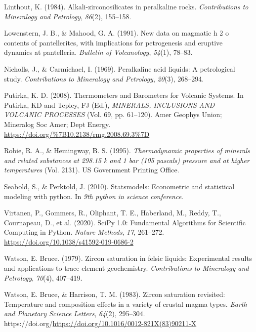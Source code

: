 \documentclass[
]{agujournal2019}
\newlength{\cslhangindent}
\newenvironment{CSLReferences}[2] %
 {\begin{list}{}{%
  \setlength{\itemindent}{0pt}
  \setlength{\leftmargin}{0pt}
  \setlength{\parsep}{0pt}
  \ifodd #1
   \setlength{\leftmargin}{\cslhangindent}
   \setlength{\itemindent}{-1\cslhangindent}
  \fi
  \setlength{\itemsep}{#2\baselineskip}}}
 {\end{list}}
\begin{document}
\begin{CSLReferences}{1}{0}
Linthout, K. (1984). Alkali-zirconosilicates in peralkaline rocks.
\emph{Contributions to Mineralogy and Petrology}, \emph{86}(2),
155--158.

Lowenstern, J. B., \& Mahood, G. A. (1991). New data on magmatic h 2 o
contents of pantellerites, with implications for petrogenesis and
eruptive dynamics at pantelleria. \emph{Bulletin of Volcanology},
\emph{54}(1), 78--83.

Nicholls, J., \& Carmichael, I. (1969). Peralkaline acid liquids: A
petrological study. \emph{Contributions to Mineralogy and Petrology},
\emph{20}(3), 268--294.

Putirka, K. D. (2008). {Thermometers and Barometers for Volcanic
Systems}. In Putirka, KD and Tepley, FJ (Ed.), \emph{{MINERALS,
INCLUSIONS AND VOLCANIC PROCESSES}} (Vol. 69, pp. 61--120). {Amer
Geophys Union; Mineralog Soc Amer; Dept Energy}.
\url{https://doi.org/\%7B10.2138/rmg.2008.69.3\%7D}

Robie, R. A., \& Hemingway, B. S. (1995). \emph{Thermodynamic properties
of minerals and related substances at 298.15 k and 1 bar (105 pascals)
pressure and at higher temperatures} (Vol. 2131). US Government Printing
Office.

Seabold, S., \& Perktold, J. (2010). Statsmodels: Econometric and
statistical modeling with python. In \emph{9th python in science
conference}.

Virtanen, P., Gommers, R., Oliphant, T. E., Haberland, M., Reddy, T.,
Cournapeau, D., et al. (2020). {{SciPy} 1.0: Fundamental Algorithms for
Scientific Computing in Python}. \emph{Nature Methods}, \emph{17},
261--272. \url{https://doi.org/10.1038/s41592-019-0686-2}

Watson, E. Bruce. (1979). Zircon saturation in felsic liquids:
Experimental results and applications to trace element geochemistry.
\emph{Contributions to Mineralogy and Petrology}, \emph{70}(4),
407--419.

Watson, E. Bruce, \& Harrison, T. M. (1983). Zircon saturation
revisited: Temperature and composition effects in a variety of crustal
magma types. \emph{Earth and Planetary Science Letters}, \emph{64}(2),
295--304.
https://doi.org/\url{https://doi.org/10.1016/0012-821X(83)90211-X}

\end{CSLReferences}
\end{document}
